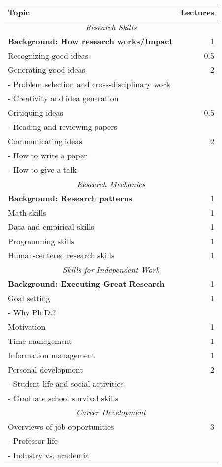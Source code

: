 \begin{table}[t]
\begin{center}
\begin{small}
\begin{tabular}{p{2.5in}|r}
{\bf Topic} & {\bf Lectures} \\ \hline
\multicolumn{2}{c}{{\em Research Skills}} \\ \hline
{\bf Background: How research works/Impact} & 1 \\
Recognizing good ideas & 0.5 \\
Generating good ideas & 2 \\
- Problem selection and cross-disciplinary work & \\
- Creativity and idea generation \\
Critiquing ideas & 0.5 \\ 
- Reading and reviewing papers\\
Communicating ideas & 2 \\ 
- How to write a paper \\
- How to give a talk \\ \hline
\multicolumn{2}{c}{{\em Research Mechanics}} \\ \hline
{\bf Background: Research patterns} & 1 \\
Math skills & 1 \\
Data and empirical skills & 1\\
Programming skills & 1 \\
Human-centered research skills & 1 \\ \hline
\multicolumn{2}{c}{{\em Skills for Independent Work}} \\ \hline
{\bf Background: Executing Great Research} & 1 \\
Goal setting & 1 \\
- Why Ph.D.? \\
Motivation & 1 \\
Time management & 1 \\
Information management & 1 \\
Personal development & 2 \\ 
- Student life and social activities & \\
- Graduate school survival skills & \\
\hline
\multicolumn{2}{c}{{\em Career Development}} \\ \hline
Overviews of job opportunities & 3 \\
- Professor life\\
- Industry vs. academia\\

\end{tabular}
\end{small}
\end{center}
\end{table}

